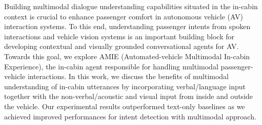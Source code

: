 Building multimodal dialogue understanding capabilities situated in the in-cabin context is crucial to enhance passenger comfort in autonomous vehicle (AV) interaction systems. To this end, understanding passenger intents from spoken interactions and vehicle vision systems is an important building block for developing contextual and visually grounded conversational agents for AV. Towards this goal, we explore AMIE (Automated-vehicle Multimodal In-cabin Experience), the in-cabin agent responsible for handling multimodal passenger-vehicle interactions. In this work, we discuss the benefits of multimodal understanding of in-cabin utterances by incorporating verbal/language input together with the non-verbal/acoustic and visual input from inside and outside the vehicle. Our experimental results outperformed text-only baselines as we achieved improved performances for intent detection with multimodal approach.
